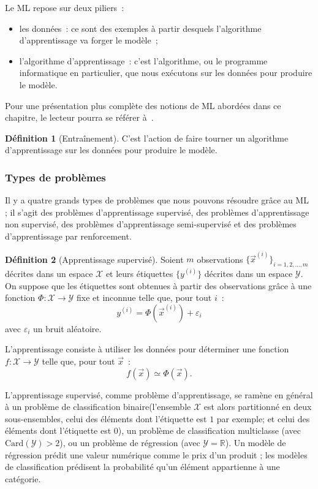 \documentclass[a4paper,12pt,twoside]{report}
\theoremstyle{definition}
\newtheorem{defi}{Définition}
\theoremstyle{plain}
\theoremstyle{remark}
\begin{document}
Le \ac{ML} repose sur deux piliers~:
\begin{itemize}
	\item les données~: ce sont des exemples à partir desquels l'algorithme d'apprentissage va forger le modèle~;
	\item l'algorithme d'apprentissage~: c'est l'algorithme, ou le programme informatique en particulier, que nous exécutons sur les données pour produire le modèle.
\end{itemize}

Pour une présentation plus complète des notions de \ac{ML} abordées dans ce chapitre, le lecteur pourra se référer à~\cite{azencott_ml}.

\begin{defi}[Entraînement]
	C'est l'action de faire tourner un algorithme d'apprentissage sur les données pour produire le modèle.
\end{defi}

\subsubsection{Types de problèmes}

Il y a quatre grands types de problèmes que nous pouvons résoudre grâce au \ac{ML} ; il s'agit des problèmes d'apprentissage supervisé, des problèmes d'apprentissage non supervisé, des problèmes d'apprentissage semi-supervisé et des problèmes d'apprentissage par renforcement.

\begin{defi}[Apprentissage supervisé]
	Soient $m$ observations $\{\vec{x}^{(i)}\}_{i=1,2,\ldots,m}$ décrites dans un espace $\mathcal{X}$ et leurs étiquettes $\{y^{(i)}\}$ décrites dans un espace $\mathcal{Y}$. On suppose que les étiquettes sont obtenues à partir des observations grâce à une fonction $\Phi : \mathcal{X} \to \mathcal{Y}$ fixe et inconnue telle que, pour tout $i$~:
	\[ y^{(i)} = \Phi(\vec{x}^{(i)}) + \varepsilon_i \]
	avec $\varepsilon_i$ un bruit aléatoire.
\end{defi}

L'apprentissage consiste à utiliser les données pour déterminer une fonction $f : \mathcal{X} \to \mathcal{Y}$ telle que, pour tout $\vec{x}$~:
\[ f(\vec{x}) \simeq \Phi(\vec{x}). \]

L'apprentissage supervisé, comme problème d'apprentissage, se ramène en général à un problème de classification binaire(l'ensemble $\mathcal{X}$ est alors partitionné en deux sous-ensembles, celui des éléments dont l'étiquette est $1$ par exemple; et celui des éléments dont l'étiquette est $0$), un problème de classification multiclasse (avec $\mathrm{Card}(\mathcal{Y}) > 2$), ou un problème de régression (avec $\mathcal{Y} = \mathbb{R}$). Un modèle de régression prédit une valeur numérique comme le prix d'un produit ; les modèles de classification prédisent la probabilité qu'un élément appartienne à une catégorie.
\end{document}
